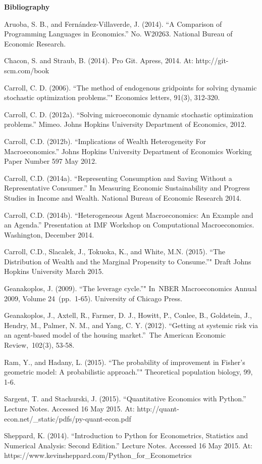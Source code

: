 \documentclass[]{article}
\begin{document}
\textbf{Bibliography}

Aruoba, S. B., and Fernández-Villaverde, J. (2014). ``A Comparison of
Programming Languages in Economics.'' No. W20263. National Bureau of
Economic Research.

Chacon, S. and Straub, B. (2014). Pro Git. Apress, 2014. At:
http://git-scm.com/book

Carroll, C. D. (2006). ``The method of endogenous gridpoints for solving
dynamic stochastic optimization problems.''" Economics letters, 91(3),
312-320.

Carroll, C. D. (2012a). ``Solving microeconomic dynamic stochastic
optimization problems.'' Mimeo. Johns Hopkins University Department of
Economics, 2012.

Carroll, C.D. (2012b). ``Implications of Wealth Heterogeneity For
Macroeconomics.'' Johns Hopkins University Department of Economics
Working Paper Number 597 May 2012.

Carroll, C.D. (2014a). ``Representing Consumption and Saving Without a
Representative Consumer.'' In Measuring Economic Sustainability and
Progress Studies in Income and Wealth. National Bureau of Economic
Research 2014.

Carroll, C.D. (2014b). ``Heterogeneous Agent Macroeconomics: An Example
and an Agenda.'' Presentation at IMF Workshop on Computational
Macroeconomics. Washington, December 2014.

Carroll, C.D., Slacalek, J., Tokuoka, K., and White, M.N. (2015). ``The
Distribution of Wealth and the Marginal Propensity to Consume.''" Draft
Johns Hopkins University March 2015.

Geanakoplos, J. (2009). ``The leverage cycle.''" In~NBER Macroeconomics
Annual 2009, Volume 24~(pp.~1-65). University of Chicago Press.

Geanakoplos, J., Axtell, R., Farmer, D. J., Howitt, P., Conlee, B.,
Goldstein, J., Hendry, M., Palmer, N. M., and Yang, C. Y. (2012).
``Getting at systemic risk via an agent-based model of the housing
market.''~The American Economic Review,~102(3), 53-58.

Ram, Y., and Hadany, L. (2015). ``The probability of improvement in
Fisher's geometric model: A probabilistic approach.''" Theoretical
population biology, 99, 1-6.

Sargent, T. and Stachurski, J. (2015). ``Quantitative Economics with
Python.'' Lecture Notes. Accessed 16 May 2015. At:
http://quant-econ.net/\_static/pdfs/py-quant-econ.pdf

Sheppard, K. (2014). ``Introduction to Python for Econometrics,
Statistics and Numerical Analysis: Second Edition.'' Lecture Notes.
Accessed 16 May 2015. At:
https://www.kevinsheppard.com/Python\_for\_Econometrics
\end{document}
